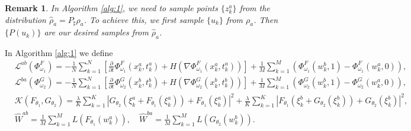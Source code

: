 \documentclass{article}
\newtheorem{remark}{Remark}
\begin{document}
\begin{remark}
 In Algorithm \ref{alg:1}, we need to sample points $\{z^a_k\}$ from the distribution $\hat{\rho}_a=P_\sharp \rho_a$. To achieve this, we first sample $\{u_k\}$ from $\rho_a$. Then $\{P(u_k)\}$ are our desired samples from $\hat{\rho}_a$.
\end{remark}
In Algorithm \ref{alg:1} we define
\begin{align*}
  &\mathcal{L}^{ab}(\Phi^F_{\omega_1}) = -\frac{1}{N}\sum_{k=1}^N \left[\frac{\partial}{\partial t}\Phi^F_{\omega_1}(x^{a}_k,t^{a}_k) + H(\nabla \Phi^F_{\omega_1} (x^a_k,t^a_k)) \right] +\frac{1}{M}\sum_{k=1}^M(\Phi^F_{\omega_1}(w^b_k,1)-\Phi^F_{\omega_1}(w^a_k , 0)),\\
  & \mathcal{L}^{ba}(\Phi^G_{\omega_2}) =   -\frac{1}{N}\sum_{k=1}^N \left[\frac{\partial}{\partial t}\Phi^G_{\omega_2}(x^{b}_k,t^{b}_k) + H(\nabla \Phi^G_{\omega_2} (x^b_k,t^b_k))\right]+\frac{1}{M}\sum_{k=1}^M(\Phi^G_{\omega_2}(w^b_k,1)-\Phi^G_{\omega_2}(w^a_k , 0)),  \\
  & \mathcal{K}({F}_{\theta_1}, {G}_{\theta_2}) =   \frac{\lambda}{ K}\sum_{k=1}^K|{G}_{\theta_2}(\xi^a_k+{F}_{\theta_1}(\xi^a_k))+{F}_{\theta_1}(\xi^a_k)|^2 + \frac{\lambda}{K} \sum_{k=1}^K|{F}_{\theta_1}(\xi^b_k+{G}_{\theta_2}(\xi^b_k))+{G}_{\theta_2}(\xi^b_k)|^2,\\
  & \widehat{W}^{ab} = \frac{1}{M}\sum_{k=1}^{M}L({F}_{\theta_1}(w^a_k)), \quad \widehat{W}^{ba} = \frac{1}{M}\sum_{k=1}^{M}L({G}_{\theta_2}(w^b_k)). \quad
\end{align*}
\end{document}
